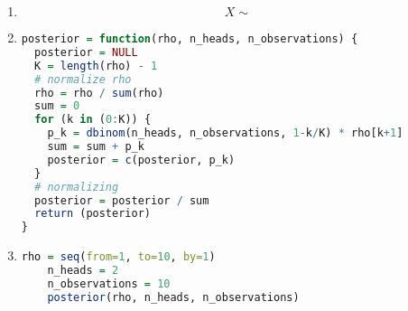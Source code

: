 \documentclass{article}
\begin{document}
\qsol{}
\begin{enumerate}
  \item 
  \[X \sim \]


  \item  
  \begin{lstlisting}[language=R]
  posterior = function(rho, n_heads, n_observations) {
  posterior = NULL
  K = length(rho) - 1
  # normalize rho
  rho = rho / sum(rho)
  sum = 0
  for (k in (0:K)) {
    p_k = dbinom(n_heads, n_observations, 1-k/K) * rho[k+1]
    sum = sum + p_k
    posterior = c(posterior, p_k)
  }
  # normalizing
  posterior = posterior / sum
  return (posterior)
}
  \end{lstlisting}

  \item 
  \begin{lstlisting}[language=R]
    rho = seq(from=1, to=10, by=1)
    n_heads = 2
    n_observations = 10
    posterior(rho, n_heads, n_observations)  
  \end{lstlisting}
  
\end{enumerate}






 
\end{document}
